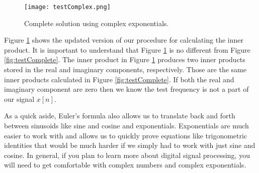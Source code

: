 \begin{figure}[h]
	\caption{Complete solution using complex exponentials.}
	\centering
	\texttt{[image: testComplex.png]}
	\label{fig:testComplex}
\end{figure}

Figure \ref{fig:testComplex} shows the updated version of our procedure for calculating the inner product.
It is important to understand that Figure \ref{fig:testComplex} is no different from Figure \ref{fig:testComplete}.  
The inner product in Figure \ref{fig:testComplex} produces two inner products stored in the real and imaginary
components, respectively.  Those are the same inner products calculated in Figure \ref{fig:testComplete}.  If
both the real and imaginary component are zero then we know the test frequency is not a part of our signal
$x[n]$.

As a quick aside, Euler's
formula also allows us to translate back and forth between sinusoids like sine and cosine and exponentials.
Exponentials are much easier to work with and allows us to quickly prove equations like trigonometric identities
that would be much harder if we simply had to work with just sine and cosine.  In general, if you plan to learn
more about digital signal processing, you will need to get comfortable with complex numbers and complex 
exponentials.
